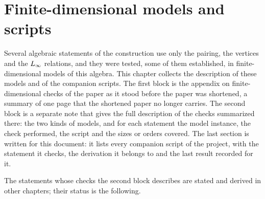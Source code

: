 \section{Finite-dimensional models and scripts}
\label{ch:finite-models}

Several algebraic statements of the construction use only the pairing, the vertices and the $L_\infty$ relations, and they were tested, some of them established, in finite-dimensional models of this algebra.
This chapter collects the description of these models and of the companion scripts.
The first block is the appendix on finite-dimensional checks of the paper as it stood before the paper was shortened, a summary of one page that the shortened paper no longer carries.
The second block is a separate note that gives the full description of the checks summarized there: the two kinds of models, and for each statement the model instance, the check performed, the script and the sizes or orders covered.
The last section is written for this document: it lists every companion script of the project, with the statement it checks, the derivation it belongs to and the last result recorded for it.

The statements whose checks the second block describes are stated and derived in other chapters; their status is the following.


